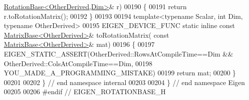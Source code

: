 \begin{DoxyCode}
      \hyperlink{class_eigen_1_1_rotation_base}{RotationBase<OtherDerived,Dim>}& r)
00190 \{
00191   \textcolor{keywordflow}{return} r.toRotationMatrix();
00192 \}
00193 
00194 \textcolor{keyword}{template}<\textcolor{keyword}{typename} Scalar, \textcolor{keywordtype}{int} Dim, \textcolor{keyword}{typename} OtherDerived>
00195 EIGEN\_DEVICE\_FUNC \textcolor{keyword}{static} \textcolor{keyword}{inline} \textcolor{keyword}{const} \hyperlink{group___core___module_class_eigen_1_1_matrix_base}{MatrixBase<OtherDerived>}& toRotationMatrix(\textcolor{keyword}{
      const} \hyperlink{group___core___module_class_eigen_1_1_matrix_base}{MatrixBase<OtherDerived>}& mat)
00196 \{
00197   EIGEN\_STATIC\_ASSERT(OtherDerived::RowsAtCompileTime==Dim && OtherDerived::ColsAtCompileTime==Dim,
00198     YOU\_MADE\_A\_PROGRAMMING\_MISTAKE)
00199   \textcolor{keywordflow}{return} mat;
00200 \}
00201 
00202 \} \textcolor{comment}{// end namespace internal}
00203 
00204 \} \textcolor{comment}{// end namespace Eigen}
00205 
00206 \textcolor{preprocessor}{#endif // EIGEN\_ROTATIONBASE\_H}
\end{DoxyCode}
